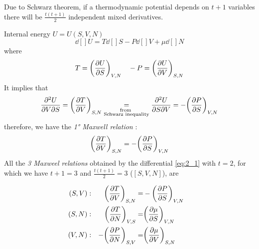 \documentclass[../main/main.tex]{subfiles}
\begin{document}
Due to Schwarz theorem, if a thermodynamic potential depends on \( t+1 \) variables there will be \( \frac{t(t+1)}{2} \)  independent mixed derivatives.
\begin{example}{Internal energy \( U=U(S,V,N)\)}{}
\begin{equation}
  \dd[]{U} = T \dd[]{S} - P \dd[]{V} + \mu \dd[]{N}
  \label{eq:2_1}
\end{equation}
where
\begin{equation*}
  T = \qty(\pdv{U}{S} )_{V,N} \quad  -P = \qty(\pdv{U}{V} )_{S,N}
\end{equation*}
 It implies that
\begin{equation*}
        \pdv{U}{V}{S} = \qty(\pdv{T}{V} )_{S,N} \underset{\substack{ \text{from } \\  \text{Schwarz inequality} } }{=} \pdv{U}{S}{V}  =-\qty(\pdv{P}{S} )_{V,N}
\end{equation*}
therefore, we have the \emph{1° Maxwell relation} :
\begin{equation*}
  \qty(\pdv{T}{V} )_{S,N} = -\qty(\pdv{P}{S} )_{V,N}
\end{equation*}
All the \emph{3 Maxweel relations} obtained by the differential \eqref{eq:2_1}
with \( t=2 \), for which we have \( t+1=3 \) and \( \frac{t(t+1)}{2}=3 \) (\( [S,V,N] \)), are

\begin{subequations}
\begin{align}
  (S,V) &:& \qty(\pdv{T}{V} )_{S,N} =& - \qty(\pdv{P}{S} )_{V,N} & \\
  (S,N) &:& \qty(\pdv{T}{N} )_{V,S} =& \qty(\pdv{\mu }{S} )_{V,N} &\\
  (V,N) &:& -\qty(\pdv{P}{N} )_{S,V} =& \qty(\pdv{\mu }{V} )_{S,N} &
 \end{align}
\label{}
\end{subequations}
\end{example}
\end{document}
